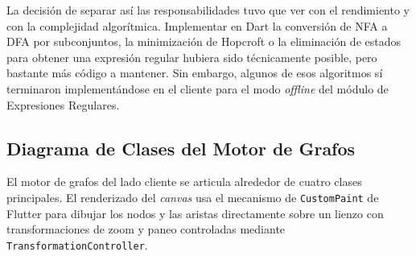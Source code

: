 La decisión de separar así las responsabilidades tuvo que ver con el rendimiento y con la
complejidad algorítmica. Implementar en Dart la conversión de NFA a DFA por subconjuntos, la
minimización de Hopcroft o la eliminación de estados para obtener una expresión regular hubiera
sido técnicamente posible, pero bastante más código a mantener. Sin embargo, algunos de esos
algoritmos sí terminaron implementándose en el cliente para el modo \textit{offline} del módulo de
Expresiones Regulares.

\subsection{Diagrama de Clases del Motor de Grafos}
\label{subsec:diagrama_clases}

El motor de grafos del lado cliente se articula alrededor de cuatro clases principales. El
renderizado del \textit{canvas} usa el mecanismo de \texttt{CustomPaint} de Flutter
\cite{flutter2024b} para dibujar los nodos y las aristas directamente sobre un lienzo con
transformaciones de zoom y paneo controladas mediante \texttt{TransformationController}.

